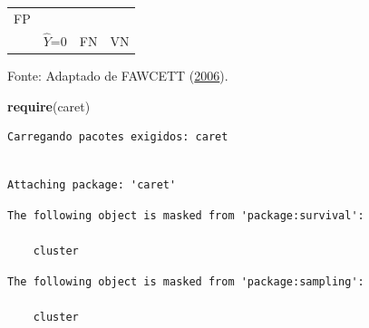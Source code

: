 \documentclass[12pt,brazil,oneside]{book}
\newenvironment{Shaded}{\begin{snugshade}}{\end{snugshade}}
\newcommand{\DataTypeTok}[1]{\textcolor[rgb]{0.13,0.29,0.53}{#1}}
\newcommand{\FloatTok}[1]{\textcolor[rgb]{0.00,0.00,0.81}{#1}}
\newcommand{\KeywordTok}[1]{\textcolor[rgb]{0.13,0.29,0.53}{\textbf{#1}}}
\newcommand{\NormalTok}[1]{#1}
\newcommand{\OperatorTok}[1]{\textcolor[rgb]{0.81,0.36,0.00}{\textbf{#1}}}
\newcommand{\StringTok}[1]{\textcolor[rgb]{0.31,0.60,0.02}{#1}}
\begin{document}
\begin{longtable}[]{@{}llll@{}}
\begin{minipage}[t]{0.14\columnwidth}
FP\strut
\end{minipage}\tabularnewline
\begin{minipage}[t]{0.25\columnwidth}\raggedright
\strut
\end{minipage} & \begin{minipage}[t]{0.15\columnwidth}\raggedright
\(\hat Y\)=0\strut
\end{minipage} & \begin{minipage}[t]{0.25\columnwidth}\raggedright
FN\strut
\end{minipage} & \begin{minipage}[t]{0.14\columnwidth}\raggedright
VN\strut
\end{minipage}\tabularnewline
\bottomrule
\end{longtable}

Fonte: Adaptado de FAWCETT (\protect\hyperlink{ref-Fawcett2006}{2006}).

\begin{Shaded}
\begin{Highlighting}[]
\KeywordTok{require}\NormalTok{(caret)}
\end{Highlighting}
\end{Shaded}

\begin{verbatim}
Carregando pacotes exigidos: caret
\end{verbatim}

\begin{verbatim}

Attaching package: 'caret'
\end{verbatim}

\begin{verbatim}
The following object is masked from 'package:survival':

    cluster
\end{verbatim}

\begin{verbatim}
The following object is masked from 'package:sampling':

    cluster
\end{verbatim}

\begin{Shaded}
\end{Shaded}
\end{document}
